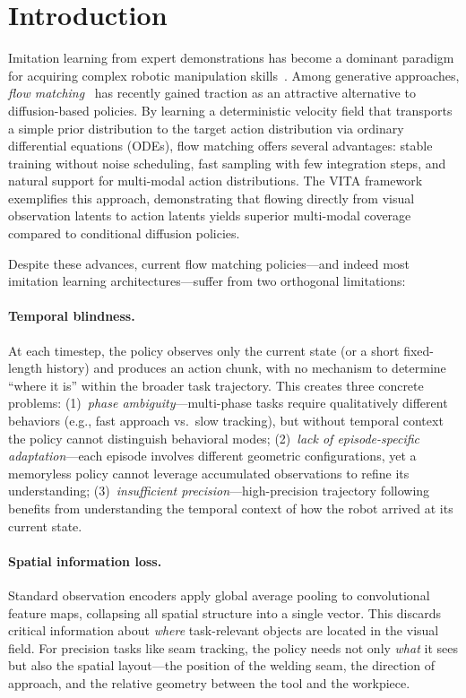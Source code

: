 \section{Introduction}
\label{sec:introduction}

Imitation learning from expert demonstrations has become a dominant paradigm for acquiring complex robotic manipulation skills~\cite{chi2023diffusion,zhao2023act,brohan2023rt2}. Among generative approaches, \emph{flow matching}~\cite{lipman2023flow,tong2024improving} has recently gained traction as an attractive alternative to diffusion-based policies. By learning a deterministic velocity field that transports a simple prior distribution to the target action distribution via ordinary differential equations (ODEs), flow matching offers several advantages: stable training without noise scheduling, fast sampling with few integration steps, and natural support for multi-modal action distributions. The VITA framework~\cite{gao2026vita} exemplifies this approach, demonstrating that flowing directly from visual observation latents to action latents yields superior multi-modal coverage compared to conditional diffusion policies.

Despite these advances, current flow matching policies---and indeed most imitation learning architectures---suffer from two orthogonal limitations:

\paragraph{Temporal blindness.} At each timestep, the policy observes only the current state (or a short fixed-length history) and produces an action chunk, with no mechanism to determine ``where it is'' within the broader task trajectory. This creates three concrete problems: (1)~\emph{phase ambiguity}---multi-phase tasks require qualitatively different behaviors (e.g., fast approach vs.\ slow tracking), but without temporal context the policy cannot distinguish behavioral modes; (2)~\emph{lack of episode-specific adaptation}---each episode involves different geometric configurations, yet a memoryless policy cannot leverage accumulated observations to refine its understanding; (3)~\emph{insufficient precision}---high-precision trajectory following benefits from understanding the temporal context of how the robot arrived at its current state.

\paragraph{Spatial information loss.} Standard observation encoders apply global average pooling to convolutional feature maps, collapsing all spatial structure into a single vector. This discards critical information about \emph{where} task-relevant objects are located in the visual field. For precision tasks like seam tracking, the policy needs not only \emph{what} it sees but also the spatial layout---the position of the welding seam, the direction of approach, and the relative geometry between the tool and the workpiece.

